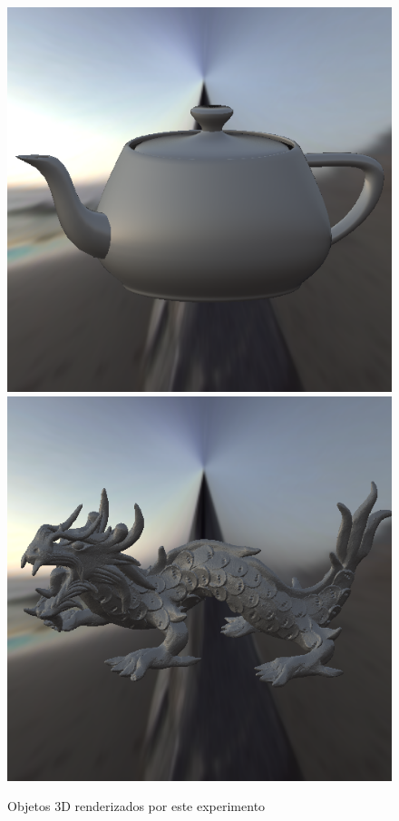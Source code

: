 \begin{figure}[H]
    \caption{\small{Objetos 3D renderizados por este experimento}}\label{fig-ashikhmin-shirley-close-to-original-eqlang}
  \includegraphics[width=\linewidth]{./Imagens/brdfs/ashikhmin-shirley-close-to-original-teapot.png}
\endminipage\hfill
{}
  \includegraphics[width=\linewidth]{./Imagens/brdfs/ashikhmin-shirley-close-to-original-dragon.png}

\end{figure}
